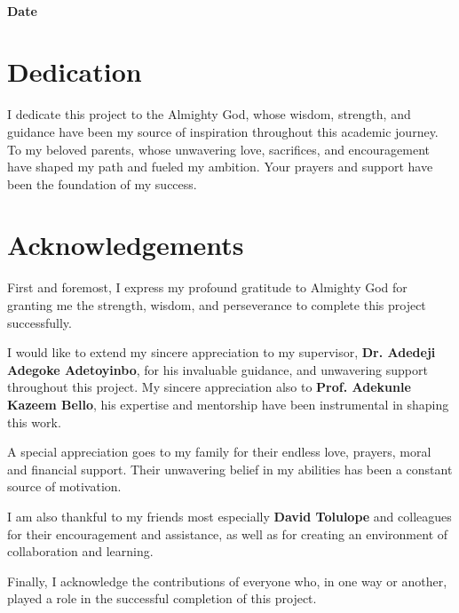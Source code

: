 \documentclass[12pt,a4paper]{report}
\begin{document}
\begin{center}
    \noindent\makebox[7cm]{\hrulefill}  \\  
    \textbf{Date}  
\end{center}

\chapter*{Dedication}
\justifying
I dedicate this project to the Almighty God, whose wisdom, strength, and guidance have been my source of inspiration throughout this academic journey.  To my beloved parents, whose unwavering love, sacrifices, and encouragement have shaped my path and fueled my ambition. Your prayers and support have been the foundation of my success.  

\chapter*{Acknowledgements}
\justifying
\setlength{\parindent}{0pt}

First and foremost, I express my profound gratitude to Almighty God for granting me the strength, wisdom, and perseverance to complete this project successfully.  

I would like to extend my sincere appreciation to my supervisor, \textbf{Dr. Adedeji Adegoke Adetoyinbo}, for his invaluable guidance, and unwavering support throughout this project. My sincere appreciation also to \textbf{Prof. Adekunle Kazeem Bello}, his expertise and mentorship have been instrumental in shaping this work.  

A special appreciation goes to my family for their endless love, prayers, moral and financial support. Their unwavering belief in my abilities has been a constant source of motivation.  

I am also thankful to my friends most especially \textbf{David Tolulope} and colleagues for their encouragement and assistance, as well as for creating an environment of collaboration and learning.

Finally, I acknowledge the contributions of everyone who, in one way or another, played a role in the successful completion of this project.  

\end{document}
